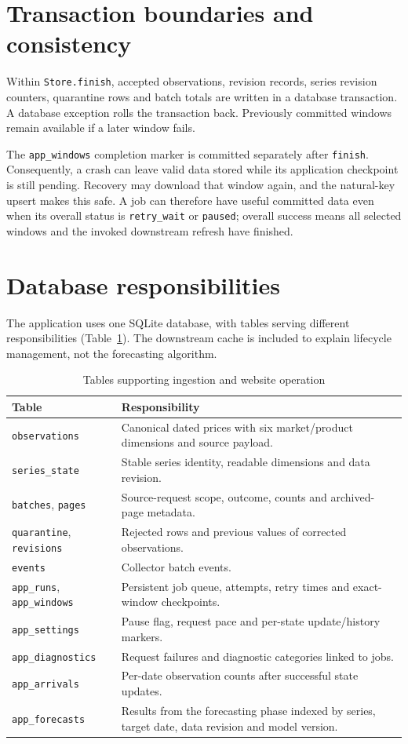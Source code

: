 \documentclass[12pt,a4paper,oneside]{report}
\numberwithin{equation}{chapter}
\numberwithin{figure}{chapter}
\numberwithin{table}{chapter}
\theoremstyle{definition}
\begin{document}
\section{Transaction boundaries and consistency}
Within \texttt{Store.finish}, accepted observations, revision records, series revision counters, quarantine rows and batch totals are written in a database transaction. A database exception rolls the transaction back. Previously committed windows remain available if a later window fails.

The \texttt{app\_windows} completion marker is committed separately after \texttt{finish}. Consequently, a crash can leave valid data stored while its application checkpoint is still pending. Recovery may download that window again, and the natural-key upsert makes this safe. A job can therefore have useful committed data even when its overall status is \texttt{retry\_wait} or \texttt{paused}; overall success means all selected windows and the invoked downstream refresh have finished.

\section{Database responsibilities}
The application uses one SQLite database, with tables serving different responsibilities (Table~\ref{tab:tables}). The downstream cache is included to explain lifecycle management, not the forecasting algorithm.

\begin{table}[H]
\centering
\caption{Tables supporting ingestion and website operation}
\label{tab:tables}
\small
\begin{tabular}{@{}p{}p{}@{}}
\toprule
Table & Responsibility \\
\midrule
\texttt{observations} & Canonical dated prices with six market/product dimensions and source payload. \\
\texttt{series\_state} & Stable series identity, readable dimensions and data revision. \\
\texttt{batches}, \texttt{pages} & Source-request scope, outcome, counts and archived-page metadata. \\
\texttt{quarantine}, \texttt{revisions} & Rejected rows and previous values of corrected observations. \\
\texttt{events} & Collector batch events. \\
\texttt{app\_runs}, \texttt{app\_windows} & Persistent job queue, attempts, retry times and exact-window checkpoints. \\
\texttt{app\_settings} & Pause flag, request pace and per-state update/history markers. \\
\texttt{app\_diagnostics} & Request failures and diagnostic categories linked to jobs. \\
\texttt{app\_arrivals} & Per-date observation counts after successful state updates. \\
\texttt{app\_forecasts} & Results from the forecasting phase indexed by series, target date, data revision and model version. \\
\bottomrule
\end{tabular}
\end{table}
\end{document}
